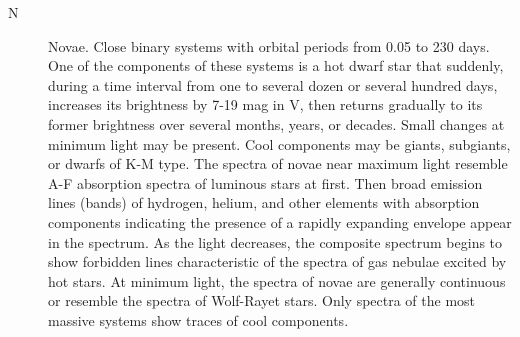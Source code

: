 \begin{description}
\item[N]		Novae. Close binary systems with orbital periods from 0.05
				to 230 days. One of the components of these systems is a hot dwarf star
				that suddenly, during a time interval from one to several dozen or
				several hundred days, increases its brightness by 7-19 mag in V, then
				returns gradually to its former brightness over several months, years,
				or decades. Small changes at minimum light may be present. Cool
				components may be giants, subgiants, or dwarfs of K-M type. The spectra
				of novae near maximum light resemble A-F absorption spectra of luminous
				stars at first. Then broad emission lines (bands) of hydrogen, helium,
				and other elements with absorption components indicating the presence of
				a rapidly expanding envelope appear in the spectrum. As the light
				decreases, the composite spectrum begins to show forbidden lines
				characteristic of the spectra of gas nebulae excited by hot stars. At
				minimum light, the spectra of novae are generally continuous or resemble
				the spectra of Wolf-Rayet stars. Only spectra of the most massive
				systems show traces of cool components.
				

\end{description}
